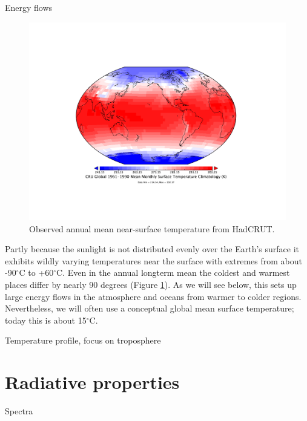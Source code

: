 \documentclass[12pt]{book}
\begin{document}
Energy flows

\begin{figure}
\begin{center}
\includegraphics[width=12 cm]{../external_figures/HadCRUT_absolute_timmean.pdf}
\end{center}
\caption{ Observed annual mean near-surface temperature from HadCRUT. } 
\label{fig:HadCRUT_temperature_map}
\end{figure}

Partly because the sunlight is not distributed evenly over the Earth's surface it exhibits wildly varying temperatures near the surface with extremes from about -90$^\circ$C to +60$^\circ$C. Even in the annual longterm mean the coldest and warmest places differ by nearly 90 degrees (Figure \ref{fig:HadCRUT_temperature_map}). As we will see below, this sets up large energy flows in the atmosphere and oceans from warmer to colder regions. Nevertheless, we will often use a conceptual global mean surface temperature; today this is about 15$^\circ$C.

Temperature profile, focus on troposphere


\section{Radiative properties}

Spectra
\end{document}
